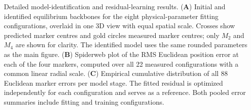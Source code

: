 \caption{Detailed model-identification and residual-learning results.
(\textbf{A}) Initial and identified equilibrium backbones for the eight physical-parameter fitting configurations, overlaid in one 3D view with equal spatial scale. Crosses show predicted marker centres and gold circles measured marker centres; only $M_2$ and $M_4$ are shown for clarity. The identified model uses the same rounded parameters as the main figure.
(\textbf{B}) Spiderweb plot of the RMS Euclidean position error at each of the four markers, computed over all 22 measured configurations with a common linear radial scale.
(\textbf{C}) Empirical cumulative distribution of all 88 Euclidean marker errors per model stage. The fitted residual is optimized independently for each configuration and serves as a reference. Both pooled error summaries include fitting and training configurations.}
